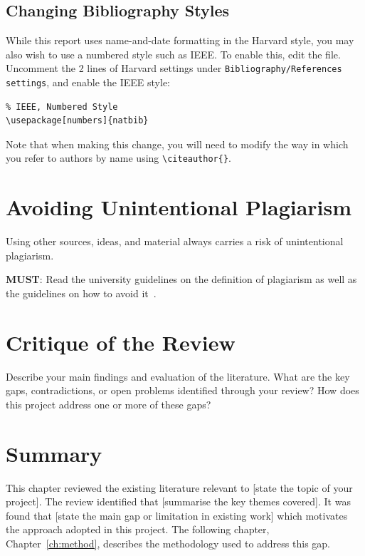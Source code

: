 \subsection{Changing Bibliography Styles}
While this report uses name-and-date formatting in the Harvard style, you may 
also wish to use a numbered style such as IEEE. To enable this, edit the 
 file. Uncomment the 2 lines of Harvard settings under 
\texttt{Bibliography/References settings}, and enable the IEEE style:

\begin{verbatim}
% IEEE, Numbered Style
\usepackage[numbers]{natbib}

\end{verbatim}

Note that when making this change, you will need to modify the way in which 
you refer to authors by name using \verb|\citeauthor{}|.

\section{Avoiding Unintentional Plagiarism}
\label{sec:lit_plagiarism}

Using other sources, ideas, and material always carries a risk of unintentional 
plagiarism.

\noindent
\textbf{\color{red}MUST}: Read the university guidelines on the definition of 
plagiarism as well as the guidelines on how to avoid 
it~\citep{uor_plagiarism}.

\section{Critique of the Review}
\label{sec:lit_critique}

Describe your main findings and evaluation of the literature. What are the key 
gaps, contradictions, or open problems identified through your review? How does 
this project address one or more of these gaps?

\section{Summary}
\label{sec:lit_summary}

This chapter reviewed the existing literature relevant to [state the topic of 
your project]. The review identified that [summarise the key themes covered]. 
It was found that [state the main gap or limitation in existing work] which 
motivates the approach adopted in this project. The following chapter, 
Chapter~\ref{ch:method}, describes the methodology used to address this gap.